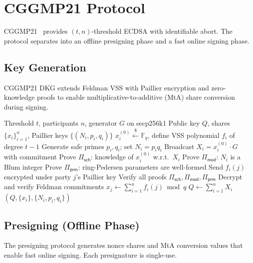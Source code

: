 \section{CGGMP21 Protocol}

\label{sec:cggmp}

CGGMP21~\cite{canetti2021cggmp} provides $(t,n)$-threshold ECDSA with identifiable
abort. The protocol separates into an offline presigning phase and a fast online
signing phase.

\subsection{Key Generation}

CGGMP21 DKG extends Feldman VSS with Paillier encryption and zero-knowledge proofs to
enable multiplicative-to-additive (MtA) share conversion during signing.

\begin{algorithm}[H]
\caption{CGGMP21 Distributed Key Generation}
\label{alg:cggmp-dkg}
\begin{algorithmic}[1]
\Require Threshold $t$, participants $n$, generator $G$ on secp256k1
\Ensure Public key $Q$, shares $\{x_i\}_{i=1}^n$, Paillier keys $\{(N_i, p_i, q_i)\}$
  \State $x_i^{(0)} \xleftarrow{\$} \mathbb{F}_q$, define VSS polynomial $f_i$ of degree $t-1$
  \State Generate safe primes $p_i, q_i$; set $N_i = p_i q_i$
  \State Broadcast $X_i = x_i^{(0)} \cdot G$ with commitment
  \State Prove $\Pi_{\mathsf{sch}}$: knowledge of $x_i^{(0)}$ w.r.t.\ $X_i$
  \State Prove $\Pi_{\mathsf{mod}}$: $N_i$ is a Blum integer
  \State Prove $\Pi_{\mathsf{prm}}$: ring-Pedersen parameters are well-formed
  \State Send $f_i(j)$ encrypted under party $j$'s Paillier key
\EndFor
{}
  \State Verify all proofs $\Pi_{\mathsf{sch}}, \Pi_{\mathsf{mod}}, \Pi_{\mathsf{prm}}$
  \State Decrypt and verify Feldman commitments
  \State $x_j \gets \sum_{i=1}^n f_i(j) \bmod q$
\EndFor
\State $Q \gets \sum_{i=1}^n X_i$
\State \Return $(Q, \{x_i\}, \{N_i, p_i, q_i\})$
\end{algorithmic}
\end{algorithm}

\subsection{Presigning (Offline Phase)}

The presigning protocol generates nonce shares and MtA conversion values that enable
fast online signing. Each presignature is single-use.

